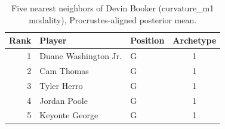 \begin{table}[htbp]
  \centering\small
  \begin{tabular}{rllc}
    \toprule
    Rank & Player & Position & Archetype \\
    \midrule
    1 & Duane Washington Jr. & G & 1 \\
    2 & Cam Thomas & G & 1 \\
    3 & Tyler Herro & G & 1 \\
    4 & Jordan Poole & G & 1 \\
    5 & Keyonte George & G & 1 \\
    \bottomrule
  \end{tabular}
  \caption{Five nearest neighbors of Devin Booker (curvature_m1 modality), Procrustes-aligned posterior mean.}
  \label{tab:Devin_Booker_neighbors_curvature_m1}
\end{table}

